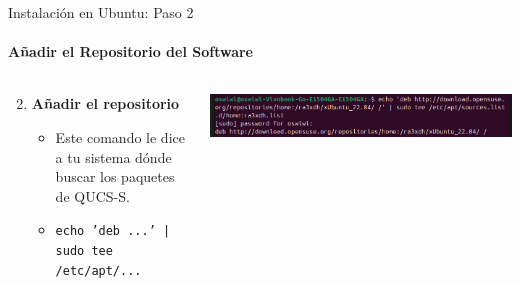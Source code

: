 \documentclass{beamer}
\begin{document}
\begin{frame}[fragile]{Instalación en Ubuntu: Paso 2}
  \framesubtitle{Añadir el Repositorio del Software}

  \begin{columns}[T]
    \begin{column}{0.5\textwidth}
      \begin{enumerate}
        \setcounter{enumi}{1} %
        \item \textbf{Añadir el repositorio}
          \begin{itemize}
            \item Este comando le dice a tu sistema dónde buscar los paquetes de QUCS-S.
            \item \small{\texttt{echo 'deb ...' | sudo tee /etc/apt/...}}
          \end{itemize}
      \end{enumerate}
    \end{column}

    \begin{column}{0.5\textwidth}
      \includegraphics[width=\columnwidth]{Imagenes/InsP2.png}
    \end{column}
  \end{columns}
\end{frame}
\end{document}

